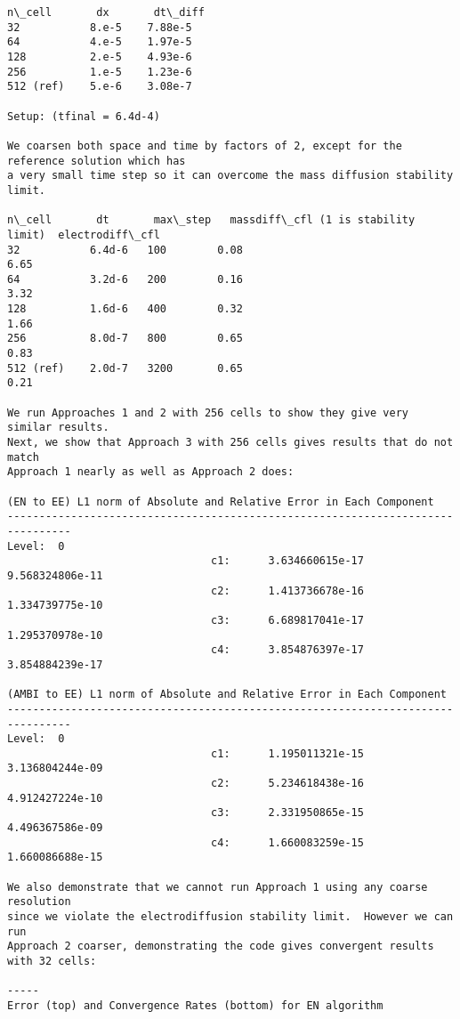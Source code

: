 \documentclass[final]{siamltex}
\begin{document}
\begin{verbatim}
n\_cell       dx       dt\_diff
32           8.e-5    7.88e-5
64           4.e-5    1.97e-5
128          2.e-5    4.93e-6
256          1.e-5    1.23e-6
512 (ref)    5.e-6    3.08e-7

Setup: (tfinal = 6.4d-4)

We coarsen both space and time by factors of 2, except for the reference solution which has
a very small time step so it can overcome the mass diffusion stability limit.

n\_cell       dt       max\_step   massdiff\_cfl (1 is stability limit)  electrodiff\_cfl
32           6.4d-6   100        0.08                                 6.65
64           3.2d-6   200        0.16                                 3.32
128          1.6d-6   400        0.32                                 1.66
256          8.0d-7   800        0.65                                 0.83
512 (ref)    2.0d-7   3200       0.65                                 0.21

We run Approaches 1 and 2 with 256 cells to show they give very similar results.
Next, we show that Approach 3 with 256 cells gives results that do not match
Approach 1 nearly as well as Approach 2 does:

(EN to EE) L1 norm of Absolute and Relative Error in Each Component
--------------------------------------------------------------------------------
Level:  0
                                c1:      3.634660615e-17     9.568324806e-11
                                c2:      1.413736678e-16     1.334739775e-10
                                c3:      6.689817041e-17     1.295370978e-10
                                c4:      3.854876397e-17     3.854884239e-17

(AMBI to EE) L1 norm of Absolute and Relative Error in Each Component
--------------------------------------------------------------------------------
Level:  0
                                c1:      1.195011321e-15     3.136804244e-09
                                c2:      5.234618438e-16     4.912427224e-10
                                c3:      2.331950865e-15     4.496367586e-09
                                c4:      1.660083259e-15     1.660086688e-15

We also demonstrate that we cannot run Approach 1 using any coarse resolution
since we violate the electrodiffusion stability limit.  However we can run
Approach 2 coarser, demonstrating the code gives convergent results with 32 cells:

-----
Error (top) and Convergence Rates (bottom) for EN algorithm


\end{verbatim}
\end{document}
